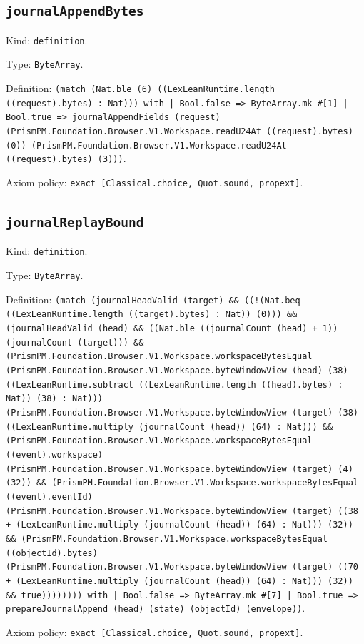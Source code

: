 \documentclass[11pt]{article}
\begin{document}
\subsection*{\texttt{journalAppendBytes}}
\noindent Kind: \texttt{definition}.\par
\noindent Type: \texttt{ByteArray}.\par
\noindent Definition: \texttt{(match (Nat.ble (6) ((LexLeanRuntime.length ((request).bytes) : Nat))) with | Bool.false => ByteArray.mk \#[1] | Bool.true => journalAppendFields (request) (PrismPM.Foundation.Browser.V1.Workspace.readU24At ((request).bytes) (0)) (PrismPM.Foundation.Browser.V1.Workspace.readU24At ((request).bytes) (3)))}.\par
\noindent Axiom policy: \texttt{exact [Classical.choice, Quot.sound, propext]}.\par
\subsection*{\texttt{journalReplayBound}}
\noindent Kind: \texttt{definition}.\par
\noindent Type: \texttt{ByteArray}.\par
\noindent Definition: \texttt{(match (journalHeadValid (target) \&\& ((!(Nat.beq ((LexLeanRuntime.length ((target).bytes) : Nat)) (0))) \&\& (journalHeadValid (head) \&\& ((Nat.ble ((journalCount (head) + 1)) (journalCount (target))) \&\& (PrismPM.Foundation.Browser.V1.Workspace.workspaceBytesEqual (PrismPM.Foundation.Browser.V1.Workspace.byteWindowView (head) (38) ((LexLeanRuntime.subtract ((LexLeanRuntime.length ((head).bytes) : Nat)) (38) : Nat))) (PrismPM.Foundation.Browser.V1.Workspace.byteWindowView (target) (38) ((LexLeanRuntime.multiply (journalCount (head)) (64) : Nat))) \&\& (PrismPM.Foundation.Browser.V1.Workspace.workspaceBytesEqual ((event).workspace) (PrismPM.Foundation.Browser.V1.Workspace.byteWindowView (target) (4) (32)) \&\& (PrismPM.Foundation.Browser.V1.Workspace.workspaceBytesEqual ((event).eventId) (PrismPM.Foundation.Browser.V1.Workspace.byteWindowView (target) ((38 + (LexLeanRuntime.multiply (journalCount (head)) (64) : Nat))) (32)) \&\& (PrismPM.Foundation.Browser.V1.Workspace.workspaceBytesEqual ((objectId).bytes) (PrismPM.Foundation.Browser.V1.Workspace.byteWindowView (target) ((70 + (LexLeanRuntime.multiply (journalCount (head)) (64) : Nat))) (32)) \&\& true)))))))) with | Bool.false => ByteArray.mk \#[7] | Bool.true => prepareJournalAppend (head) (state) (objectId) (envelope))}.\par
\noindent Axiom policy: \texttt{exact [Classical.choice, Quot.sound, propext]}.\par
\end{document}
